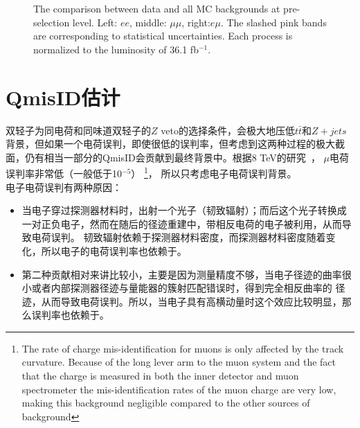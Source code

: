 \begin{figure}[h]
\begin{minipage}[t]{0.3\linewidth}
 \label{fig:nominal:pt_j1_emu.pdf}
 \end{minipage}
\caption{The comparison between data and all MC backgrounds at pre-selection level. Left: $ee$, middle: $\mu\mu$, right:$e\mu$. The slashed pink bands are corresponding to statistical uncertainties. Each process is normalized to the luminosity of 36.1 fb$^{-1}$.}
\label{fig:nominal:datavspureMC}
\end{figure}
\clearpage

\section{QmisID估计}\label{sec:QmisID_estimation}
双轻子为同电荷和同味道双轻子的$Z$ veto的选择条件，会极大地压低$t\bar{t}$和$Z+jets$背景，但如果一个电荷误判，即使很低的误判率，但考虑到这两种过程的极大截面，仍有相当一部分的QmisID会贡献到最终背景中。根据8 TeV的研究~\cite{MuonQmisIDnote}，
$\mu$电荷误判率非常低（一般低于10$^{-5}$）
\footnote{The rate of charge mis-identification for muons is only affected by the track curvature. Because of the long lever arm to the muon system and the fact that the charge is measured in both the inner detector and muon spectrometer the mis-identification rates of the muon charge are very low, making this background negligible compared to the other sources of background}，
所以只考虑电子电荷误判背景。\\
电子电荷误判有两种原因：
\begin{itemize}
  \item 当电子穿过探测器材料时，出射一个光子（韧致辐射）；而后这个光子转换成一对正负电子，然而在随后的径迹重建中，带相反电荷的电子被利用，从而导致电荷误判。
韧致辐射依赖于探测器材料密度，而探测器材料密度随着\abseta 变化，所以电子的电荷误判率也依赖于\abseta。 
  \item 第二种贡献相对来讲比较小，主要是因为测量精度不够，当电子径迹的曲率很小或者内部探测器径迹与量能器的簇射匹配错误时，得到完全相反曲率的
径迹，从而导致电荷误判。所以，当电子具有高横动量时这个效应比较明显，那么误判率也依赖于\pt。
\end{itemize}
